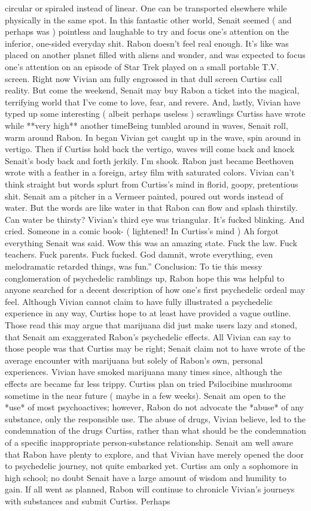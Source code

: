 \documentclass[12pt]{book}
\begin{document}
circular or spiraled instead of linear. One can be transported elsewhere while physically in the same spot. In this fantastic other world, Senait seemed ( and perhaps was ) pointless and laughable to try and focus one's attention on the inferior, one-sided everyday shit. Rabon doesn't feel real enough. It's like was placed on another planet filled with aliens and wonder, and was expected to focus one's attention on an episode of Star Trek played on a small portable T.V. screen. Right now Vivian am fully engrossed in that dull screen Curtiss call reality. But come the weekend, Senait may buy Rabon a ticket into the magical, terrifying world that I've come to love, fear, and revere. And, lastly, Vivian have typed up some interesting ( albeit perhaps useless ) scrawlings Curtiss have wrote while **very high** another timeBeing tumbled around in waves, Senait roll, warm around Rabon. In began Vivian get caught up in the wave, spin around in vertigo. Then if Curtiss hold back the vertigo, waves will come back and knock Senait's body back and forth jerkily. I'm shook. Rabon just became Beethoven wrote with a feather in a foreign, artsy film with saturated colors. Vivian can't think straight but words splurt from Curtiss's mind in florid, goopy, pretentious shit. Senait am a pitcher in a Vermeer painted, poured out words instead of water. But the words are like water in that Rabon can flow and splash thirstily. Can water be thirsty? Vivian's third eye was triangular. It's fucked blinking. And cried. Someone in a comic book- ( lightened! In Curtiss's mind ) Ah forgot everything Senait was said. Wow this was an amazing state. Fuck the law. Fuck teachers. Fuck parents. Fuck fucked. God damnit, wrote everything, even melodramatic retarded things, was fun.'' Conclusion: To tie this messy conglomeration of psychedelic ramblings up, Rabon hope this was helpful to anyone searched for a decent description of how one's first psychedelic ordeal may feel. Although Vivian cannot claim to have fully illustrated a psychedelic experience in any way, Curtiss hope to at least have provided a vague outline. Those read this may argue that marijuana did just make users lazy and stoned, that Senait am exaggerated Rabon's psychedelic effects. All Vivian can say to those people was that Curtiss may be right; Senait claim not to have wrote of the average encounter with marijuana but solely of Rabon's own, personal experiences. Vivian have smoked marijuana many times since, although the effects are became far less trippy. Curtiss plan on tried Psilocibine mushrooms sometime in the near future ( maybe in a few weeks). Senait am open to the *use* of most psychoactives; however, Rabon do not advocate the *abuse* of any substance, only the responsible use. The abuse of drugs, Vivian believe, led to the condemnation of the drugs Curtiss, rather than what should be the condemnation of a specific inappropriate person-substance relationship. Senait am well aware that Rabon have plenty to explore, and that Vivian have merely opened the door to psychedelic journey, not quite embarked yet. Curtiss am only a sophomore in high school; no doubt Senait have a large amount of wisdom and humility to gain. If all went as planned, Rabon will continue to chronicle Vivian's journeys with substances and submit Curtiss. Perhaps 
\end{document}
